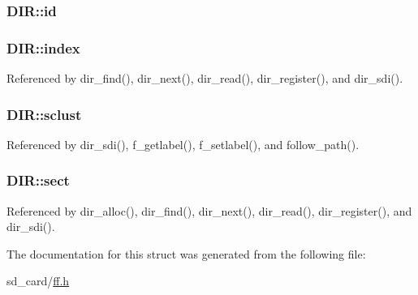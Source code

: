 \hypertarget{structDIR_aca2c95a99a04173917ec70c030891383}{
\subsubsection[{id}]{ D\-I\-R\-::id}}\label{structDIR_aca2c95a99a04173917ec70c030891383}
\hypertarget{structDIR_ab95119fbacbe45e3e9ee0f962b844092}{
\subsubsection[{index}]{ D\-I\-R\-::index}}\label{structDIR_ab95119fbacbe45e3e9ee0f962b844092}


Referenced by dir\-\_\-find(), dir\-\_\-next(), dir\-\_\-read(), dir\-\_\-register(), and dir\-\_\-sdi().

\hypertarget{structDIR_a9212af5877b94d790dd3bab3aa320994}{
\subsubsection[{sclust}]{ D\-I\-R\-::sclust}}\label{structDIR_a9212af5877b94d790dd3bab3aa320994}


Referenced by dir\-\_\-sdi(), f\-\_\-getlabel(), f\-\_\-setlabel(), and follow\-\_\-path().

\hypertarget{structDIR_ad01fcc812ed0dad11a593574336adc9e}{
\subsubsection[{sect}]{ D\-I\-R\-::sect}}\label{structDIR_ad01fcc812ed0dad11a593574336adc9e}


Referenced by dir\-\_\-alloc(), dir\-\_\-find(), dir\-\_\-next(), dir\-\_\-read(), dir\-\_\-register(), and dir\-\_\-sdi().



The documentation for this struct was generated from the following file\-:\begin{DoxyCompactItemize}
\item 
sd\-\_\-card/\hyperlink{ff_8h}{ff.\-h}\end{DoxyCompactItemize}
